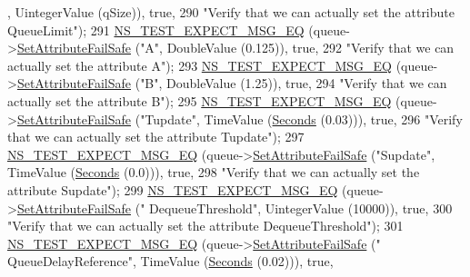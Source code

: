 \begin{DoxyCode}
      , UintegerValue (qSize)), \textcolor{keyword}{true},
290                          \textcolor{stringliteral}{"Verify that we can actually set the attribute QueueLimit"});
291   \hyperlink{group__testing_ga7304ba46a28d8cf08dfdfd6499cf7068}{NS\_TEST\_EXPECT\_MSG\_EQ} (queue->\hyperlink{classns3_1_1ObjectBase_aa7d333004e970f925a4ed5df275541b5}{SetAttributeFailSafe} (\textcolor{stringliteral}{"A"}, 
      DoubleValue (0.125)), \textcolor{keyword}{true},
292                          \textcolor{stringliteral}{"Verify that we can actually set the attribute A"});
293   \hyperlink{group__testing_ga7304ba46a28d8cf08dfdfd6499cf7068}{NS\_TEST\_EXPECT\_MSG\_EQ} (queue->\hyperlink{classns3_1_1ObjectBase_aa7d333004e970f925a4ed5df275541b5}{SetAttributeFailSafe} (\textcolor{stringliteral}{"B"}, 
      DoubleValue (1.25)), \textcolor{keyword}{true},
294                          \textcolor{stringliteral}{"Verify that we can actually set the attribute B"});
295   \hyperlink{group__testing_ga7304ba46a28d8cf08dfdfd6499cf7068}{NS\_TEST\_EXPECT\_MSG\_EQ} (queue->\hyperlink{classns3_1_1ObjectBase_aa7d333004e970f925a4ed5df275541b5}{SetAttributeFailSafe} (\textcolor{stringliteral}{"Tupdate"}, 
      TimeValue (\hyperlink{group__timecivil_ga33c34b816f8ff6628e33d5c8e9713b9e}{Seconds} (0.03))), \textcolor{keyword}{true},
296                          \textcolor{stringliteral}{"Verify that we can actually set the attribute Tupdate"});
297   \hyperlink{group__testing_ga7304ba46a28d8cf08dfdfd6499cf7068}{NS\_TEST\_EXPECT\_MSG\_EQ} (queue->\hyperlink{classns3_1_1ObjectBase_aa7d333004e970f925a4ed5df275541b5}{SetAttributeFailSafe} (\textcolor{stringliteral}{"Supdate"}, 
      TimeValue (\hyperlink{group__timecivil_ga33c34b816f8ff6628e33d5c8e9713b9e}{Seconds} (0.0))), \textcolor{keyword}{true},
298                          \textcolor{stringliteral}{"Verify that we can actually set the attribute Supdate"});
299   \hyperlink{group__testing_ga7304ba46a28d8cf08dfdfd6499cf7068}{NS\_TEST\_EXPECT\_MSG\_EQ} (queue->\hyperlink{classns3_1_1ObjectBase_aa7d333004e970f925a4ed5df275541b5}{SetAttributeFailSafe} (\textcolor{stringliteral}{"
      DequeueThreshold"}, UintegerValue (10000)), \textcolor{keyword}{true},
300                          \textcolor{stringliteral}{"Verify that we can actually set the attribute DequeueThreshold"});
301   \hyperlink{group__testing_ga7304ba46a28d8cf08dfdfd6499cf7068}{NS\_TEST\_EXPECT\_MSG\_EQ} (queue->\hyperlink{classns3_1_1ObjectBase_aa7d333004e970f925a4ed5df275541b5}{SetAttributeFailSafe} (\textcolor{stringliteral}{"
      QueueDelayReference"}, TimeValue (\hyperlink{group__timecivil_ga33c34b816f8ff6628e33d5c8e9713b9e}{Seconds} (0.02))), \textcolor{keyword}{true},

\end{DoxyCode}
